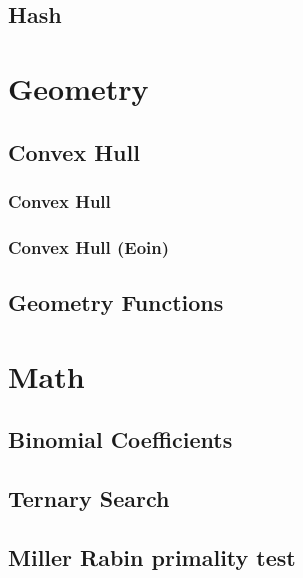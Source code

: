 \documentclass[twocolumn, landscape]{report}
\begin{document}
        \section{Hash}
        

    \chapter*{Geometry}
        \section{Convex Hull}
            \subsection{Convex Hull}
            
            \subsection{Convex Hull (Eoin)}
            
        \section{Geometry Functions}
            
            


    \chapter*{Math}
        \section{Binomial Coefficients}
        
        \section{Ternary Search}
        
        \section{Miller Rabin primality test}
        
\end{document}
